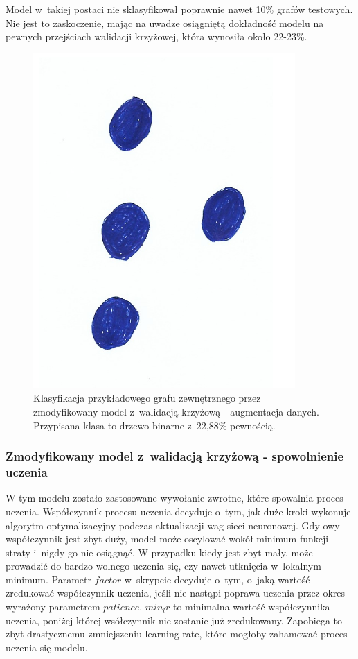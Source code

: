 Model w~takiej postaci nie sklasyfikował poprawnie nawet 10\% grafów testowych.
Nie jest to zaskoczenie, mając na uwadze osiągniętą dokładność modelu na pewnych przejściach walidacji krzyżowej,
która wynosiła około 22-23\%.

\begin{figure}[ht]
	\centering
	\includegraphics[width=10cm]{../graph_classification/test_graphs/drawn/empty-8.png}
	\caption{Klasyfikacja przykładowego grafu zewnętrznego przez zmodyfikowany model z~walidacją krzyżową - augmentacja danych.
		Przypisana klasa to drzewo binarne z~22,88\% pewnością.}
	\label{Fig:tests-cv-3d}
\end{figure}
\FloatBarrier

\subsubsection{Zmodyfikowany model z~walidacją krzyżową - spowolnienie uczenia}

W tym modelu zostało zastosowane wywołanie zwrotne, które spowalnia proces uczenia.
Współczynnik procesu uczenia decyduje o~tym, jak duże kroki wykonuje algorytm optymalizacyjny podczas aktualizacji wag sieci neuronowej.
Gdy owy współczynnik jest zbyt duży, model może oscylować wokół minimum funkcji straty i~nigdy go nie osiągnąć.
W przypadku kiedy jest zbyt mały, może prowadzić do bardzo wolnego uczenia się, czy nawet utknięcia w~lokalnym minimum.
Parametr $factor$ w~skrypcie decyduje o~tym, o~jaką wartość zredukować współczynnik uczenia,
jeśli nie nastąpi poprawa uczenia przez okres wyrażony parametrem $patience$.
$min_lr$ to minimalna wartość współczynnika uczenia, poniżej której wsółczynnik nie zostanie już zredukowany.
Zapobiega to zbyt drastycznemu zmniejszeniu learning rate, które mogłoby zahamować proces uczenia się modelu.

